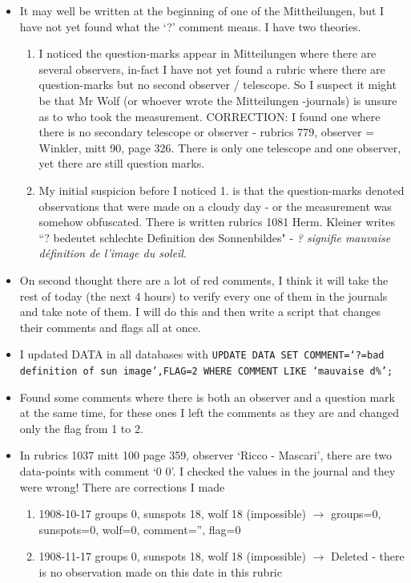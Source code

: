 \documentclass[12pt]{article}
\begin{document}
\begin{itemize}
    \item It may well be written at the beginning of one of the Mittheilungen, but I have not yet found what the `?' comment means. I have two theories.\label{what is flag 2 question mark}
    \begin{enumerate}
        \item I noticed the question-marks appear in Mitteilungen where there are several observers, in-fact I have not yet found a rubric where there are question-marks but no second observer / telescope. So I suspect it might be that Mr Wolf (or whoever wrote the Mitteilungen -journals) is unsure as to who took the measurement. CORRECTION: I found one where there is no secondary telescope or observer - rubrics 779, observer = Winkler, mitt 90, page 326. There is only one telescope and one observer, yet there are still question marks.
        \item My initial suspicion before I noticed 1. is that the question-marks denoted observations that were made on a cloudy day - or the measurement was somehow obfuscated. There is written rubrics 1081 Herm. Kleiner writes ``? bedeutet schlechte Definition des Sonnenbildes" - \textit{? signifie mauvaise définition de l'image du soleil}.
    \end{enumerate}
    \item On second thought there are a lot of red comments, I think it will take the rest of today (the next 4 hours) to verify every one of them in the journals and take note of them. I will do this and then write a script that changes their comments and flags all at once.
    \item I updated DATA in all databases with \texttt{UPDATE DATA SET COMMENT=`?=bad definition of sun image',FLAG=2 WHERE COMMENT LIKE `mauvaise d\%';}
    \item Found some comments where there is both an observer and a question mark at the same time, for these ones I left the comments as they are and changed only the flag from 1 to 2.
    \item In rubrics 1037 mitt 100 page 359, observer `Ricco - Mascari', there are two data-points with comment `0 0'. I checked the values in the journal and they were wrong! There are corrections I made
    \begin{enumerate}
        \item 1908-10-17 groups 0, sunspots 18, wolf 18 (impossible) $\to$ groups=0, sunspots=0, wolf=0, comment='', flag=0
        \item 1908-11-17 groups 0, sunspots 18, wolf 18 (impossible) $\to$ Deleted - there is no observation made on this date in this rubric

\end{enumerate}
\end{itemize}
\end{document}
